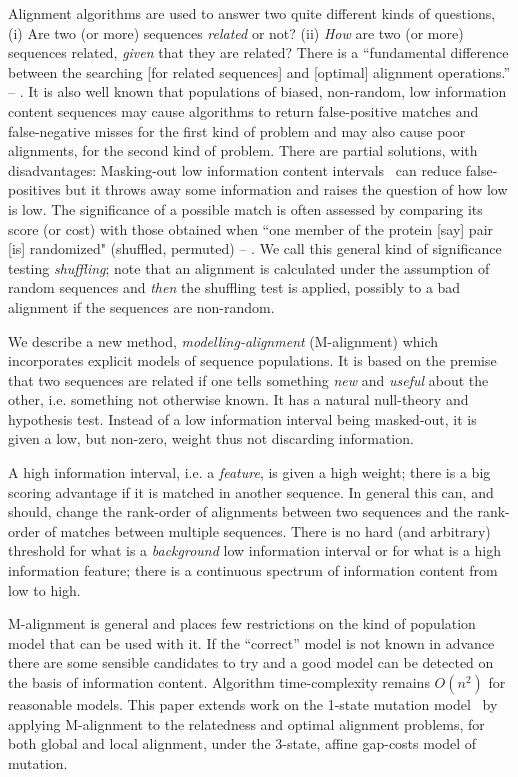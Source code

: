 \documentclass[letterpaper,11pt,oneside]{article}
\begin{document}
\begin{multicols}{2}
Alignment algorithms are used to answer two quite different kinds of questions,
(i) Are two (or more) sequences {\em related} or not?
(ii) {\em How} are two (or more) sequences related,
{\em given} that they are related?
There is a ``fundamental difference between
the searching [for related sequences] and [optimal] alignment operations.'' --
\cite{gribskov96}.
It is also well known that populations of biased, non-random,
low information content sequences may cause algorithms
to return false-positive matches and false-negative misses for
the first kind of problem and may also cause poor alignments,
for the second kind of problem.
There are partial solutions, with disadvantages:
Masking-out low information content intervals~\cite{claverie93}
can reduce false-positives but it throws away some information and
raises the question of how low is low.
The significance of a possible match is often assessed by comparing
its score (or cost) with those obtained when ``one member of
the protein [say] pair [is] randomized"
(shuffled, permuted) -- \cite{needleman70}.
We call this general kind of significance testing {\em shuffling};
note that an alignment is calculated under the assumption of random sequences
and {\em then} the shuffling test is applied, possibly to a bad alignment
if the sequences are non-random.

We describe a new method, {\em modelling-alignment} (M-alignment)
which incorporates explicit models of sequence populations.
It is based on the premise that two sequences are related if one tells
something {\em new} and {\em useful} about the other,
i.e. something not otherwise known.
It has a natural null-theory and hypothesis test.
Instead of a low information interval being masked-out, it is given
a low, but non-zero, weight thus not discarding information.

A high information interval, i.e. a {\em feature}, is given a high weight;
there is a big scoring advantage if it is matched in another sequence.
In general this can, and should, change the rank-order of alignments
between two sequences and the rank-order of matches between multiple sequences.
There is no hard (and arbitrary) threshold for what is
a {\em background} low information interval or
for what is a high information feature;
there is a continuous spectrum of information content from low to high.

M-alignment is general and places few restrictions on the kind
of population model that can be used with it.
If the ``correct'' model is not known in advance
there are some sensible candidates to try
and a good model can be detected on the basis of information content.
Algorithm time-complexity remains $O(n^2)$ for reasonable models.
This paper extends work on the 1-state mutation model~\cite{allison99}
by applying M-alignment to
the relatedness and optimal alignment problems,
for both global \cite{needleman70} and local \cite{smith81} alignment,
under the 3-state, affine gap-costs model \cite{gotoh82} of mutation.


\end{multicols}
\end{document}

